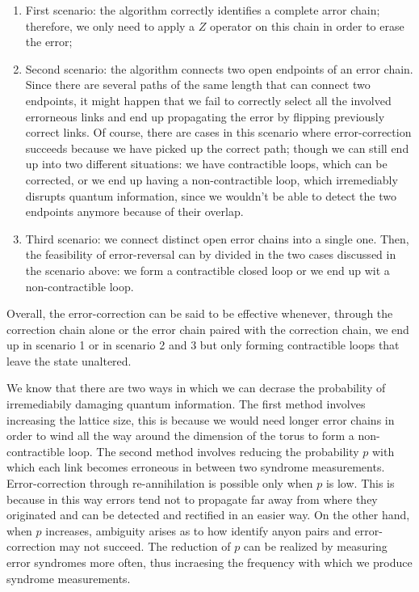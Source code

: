 \documentclass[12pt]{report}
\begin{document}
	\begin{minipage}{1 \textwidth}
		
		\begin{enumerate}
			\item First scenario: the algorithm correctly identifies a complete arror chain; therefore, we only need to apply a $Z$ operator on this chain in order to erase the error;
			
			
			\item Second scenario: the algorithm connects two open endpoints of an error chain. Since there are several paths of the same length that can connect two endpoints, it might happen that we fail to correctly select all the involved errorneous links and end up propagating the error by flipping previously correct links. 
			Of course, there are cases in this scenario where error-correction succeeds because we have picked up the correct path; though we can still end up into two different situations: we have contractible loops, which can be corrected, or we end up having a non-contractible loop, which irremediably disrupts quantum information, since we wouldn't be able to detect the two endpoints anymore because of their overlap.
			
			
			\item Third scenario: we connect distinct open error chains into a single one. Then, the feasibility of error-reversal can by divided in the two cases discussed in the scenario above: we form a contractible closed loop or we end up wit a non-contractible loop. \newline
			
			
		\end{enumerate}
		
		
		Overall, the error-correction can be said to be effective whenever, through the correction chain alone or the error chain paired with the correction chain, we end up in scenario 1 or in scenario 2 and 3 but only forming contractible loops that leave the state unaltered. \newline
		
		We know that there are two ways in which we can decrase the probability of irremediabily damaging quantum information. The first method involves increasing the lattice size, this is because we would need longer error chains in order to wind all the way around the dimension of the torus to form a non-contractible loop. The second method involves reducing the probability $p$ with which each link becomes erroneous in between two syndrome measurements. 
		Error-correction through re-annihilation is possible only when $p$ is low. 
		This is because in this way errors tend not to propagate far away from where they originated and can be detected and rectified in an easier way. On the other hand, when $p$ increases, ambiguity arises as to how identify anyon pairs and error-correction may not succeed. The reduction of $p$ can be realized by measuring error syndromes more often, thus incraesing the frequency with which we produce syndrome measurements.
		\newline
		

\end{minipage}
\end{document}
